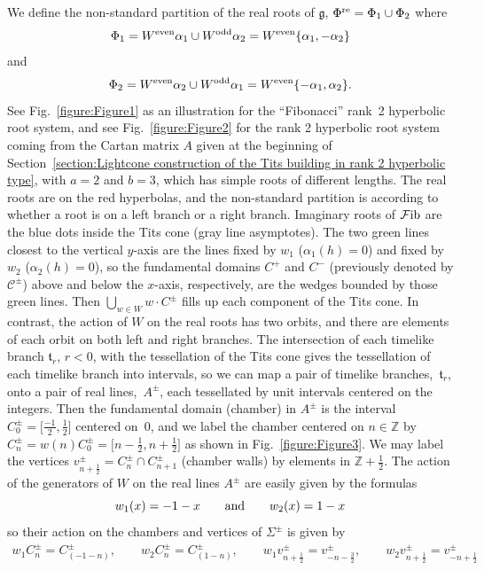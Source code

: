 \documentclass[pdftex]{sigma}
\numberwithin{equation}{section}
\def\Z{\mathbb{Z}}
\def\a{\alpha}
\def\roots{{\Phi}}
\def\cC{\mathcal C}
\def\cF{\mathcal F}
\def\fg{\mathfrak{g}}
\def\ft{\mathfrak{t}}
\begin{document}
We define the non-standard partition of the real roots of $\fg$, $\roots^{\rm re} = \roots_1\cup \roots_2$ where
\[\roots_1 = W^{\rm even}\a_1\cup W^{\rm odd} \a_2 = W^{\rm even}\{\a_1,-\a_2\}\]
and
\[\roots_2 = W^{\rm even}\a_2\cup W^{\rm odd} \a_1 = W^{\rm even}\{-\a_1,\a_2\} .\]
See Fig.~\ref{figure:Figure1} as an illustration for the ``Fibonacci'' rank~2 hyperbolic root system,
and see Fig.~\ref{figure:Figure2} for the rank 2 hyperbolic
root system coming from the Cartan matrix $A$ given at the beginning of
Section~\ref{section:Lightcone construction of the Tits building in rank 2 hyperbolic type}, with $a = 2$ and $b = 3$, which has
simple roots of different lengths. The real roots are on the red hyperbolas, and the non-standard partition is according to
whether a root is on a left branch or a right branch.
Imaginary roots of $\cF{\rm ib}$
are the blue dots inside the Tits cone (gray line asymptotes). The two green lines closest to the vertical $y$-axis are the lines fixed by $w_1$ ($\a_1(h) = 0$) and fixed by $w_2$ ($\a_2(h) = 0$), so the fundamental domains $C^+$ and $C^-$ (previously denoted by $\cC^\pm$) above and below the $x$-axis, respectively, are the wedges bounded by those green lines. Then $\bigcup\limits_{w\in W} w\cdot C^\pm$ fills up each component of the Tits cone. In contrast, the action of $W$ on the real roots has two orbits, and there are elements of each orbit on both left and right branches. The intersection of each timelike branch $\ft_r$, $r<0$, with the tessellation of the Tits cone gives the tessellation of each timelike branch into intervals, so we can map
a pair of timelike branches,~$\ft_r$, onto a pair of real lines,~$A^\pm$,
each tessellated by unit intervals centered on the integers. Then the fundamental domain (chamber) in $A^\pm$ is the interval $C^\pm_0 = \big[\frac{-1}{2}, \frac{1}{2}\big]$ centered on~$0$, and we label the chamber centered on $n\in\Z$ by
$C^\pm_n = w(n)C^\pm_0 = \big[n-\frac{1}{2}, n+\frac{1}{2}\big]$ as shown in Fig.~\ref{figure:Figure3}.
We may label the vertices $v^\pm_{n+\frac{1}{2}} = C^\pm_n \cap C^\pm_{n+1}$ (chamber walls) by elements in $\Z+\frac{1}{2}$.
The action of the generators of $W$ on the real lines $A^\pm$
are easily given by the formulas
\[w_1(x) = -1-x \qquad\hbox{and}\qquad w_2(x) = 1-x\]
so their action on the chambers and vertices of $\Sigma^\pm$ is given by
\begin{gather*} w_1 C^\pm_n = C^\pm_{(-1-n)},\qquad w_2 C^\pm_n = C^\pm_{(1-n)} ,\qquad
w_1 v^\pm_{n+\frac{1}{2}} = v^\pm_{-n-\frac{3}{2}},\qquad w_2 v^\pm_{n+\frac{1}{2}} = v^\pm_{-n+\frac{1}{2}}\end{gather*}
\end{document}
